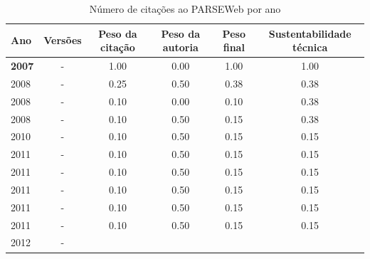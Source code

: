 \begin{table}[H]
\caption{Número de citações ao PARSEWeb por ano}
\centering
\begin{tabular}{| l | c | c | c | c | c |}
  \hline
  Ano & Versões & Peso da citação & Peso da autoria & Peso final & Sustentabilidade técnica \\
  \hline
            {\bf 2007}
          &
          -
          &
          1.00
          &
          0.00
          &
          1.00
          &
            {\color{blue} 1.00}
          \\
\hline
            2008
          &
          -
          &
          0.25
          &
          0.50
          &
          0.38
          &
            {\color{red} 0.38}
          \\
            2008
          &
          -
          &
          0.10
          &
          0.00
          &
          0.10
          &
            {\color{red} 0.38}
          \\
            2008
          &
          -
          &
          0.10
          &
          0.50
          &
          0.15
          &
            {\color{red} 0.38}
          \\
\hline
            2010
          &
          -
          &
          0.10
          &
          0.50
          &
          0.15
          &
            {\color{red} 0.15}
          \\
\hline
            2011
          &
          -
          &
          0.10
          &
          0.50
          &
          0.15
          &
            {\color{red} 0.15}
          \\
            2011
          &
          -
          &
          0.10
          &
          0.50
          &
          0.15
          &
            {\color{red} 0.15}
          \\
            2011
          &
          -
          &
          0.10
          &
          0.50
          &
          0.15
          &
            {\color{red} 0.15}
          \\
            2011
          &
          -
          &
          0.10
          &
          0.50
          &
          0.15
          &
            {\color{red} 0.15}
          \\
            2011
          &
          -
          &
          0.10
          &
          0.50
          &
          0.15
          &
            {\color{red} 0.15}
          \\
\hline
            2012
          &
          -

\end{tabular}
\end{table}
